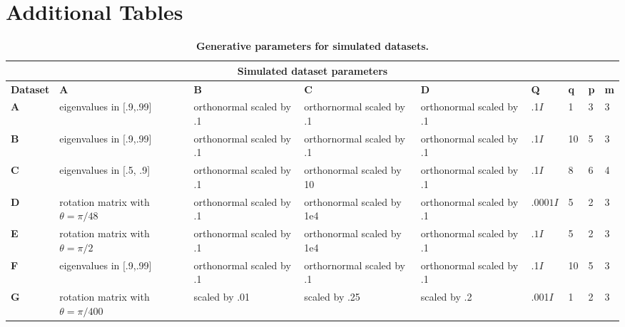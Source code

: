 \section{Additional Tables}
\label{sec:appendix2:tables}

\begin{table*}[ht]
\setlength{\tabcolsep}{5pt}
\centering
\caption{\textbf{Generative parameters for simulated datasets.}}
\vspace{0.5cm}
\begin{tabular}{|p{1.5cm}||p{2.5cm}|p{2.2cm}|p{2.2cm}|p{2.2cm}|p{1.1cm}|p{0.4cm}|p{0.4cm}|p{0.4cm}|}
 \hline
 \multicolumn{9}{|c|}{\textbf{Simulated dataset parameters }} \\
 \hline
 \textbf{Dataset} & \textbf{A} & \textbf{B} & \textbf{C}  & \textbf{D} & \textbf{Q} & \textbf{q} & \textbf{p} & \textbf{m} \\
 \hline
 \textbf{A} &   eigenvalues in [.9,.99]  & orthonormal scaled by .1   & orthornormal scaled by .1 & orthonormal scaled by .1 & .1$I$ & 1 & 3 & 3 \\
 \textbf{B} &   eigenvalues in [.9,.99]  & orthonormal scaled by .1   & orthornormal scaled by .1 & orthonormal scaled by .1  & .1$I$ & 10 & 5 & 3 \\
  \textbf{C} &   eigenvalues in [.5, .9]  & orthonormal scaled by .1  & orthonormal scaled by 10 & orthonormal scaled by .1 & .1$I$ & 8 & 6 & 4 \\
  \textbf{D}    & rotation matrix with $\theta = \pi/48$ & orthonormal scaled by .1 &  orthonormal scaled by 1e4 & orthonormal scaled by .1 & $.0001I$ & 5 & 2 & 3 \\
   \textbf{E}    & rotation matrix with $\theta = \pi/2$ & orthonormal scaled by .1 &  orthonormal scaled by 1e4 & orthonormal scaled by .1  & $.1I$ & 5 & 2 & 3\\
    \textbf{F}    & eigenvalues in [.9,.99]  & orthonormal scaled by .1   & orthornormal scaled by .1 & orthonormal scaled by .1  & .1$I$ & 10 & 5 & 3 \\
    \textbf{G}    & rotation matrix with $\theta = \pi/400$  & scaled by .01   & scaled by .25 & scaled by .2  & .001$I$ & 1 & 2 & 3 \\
 \hline
\end{tabular}
\label{table:ap2:1}
\vspace{-0.3cm}
\end{table*}